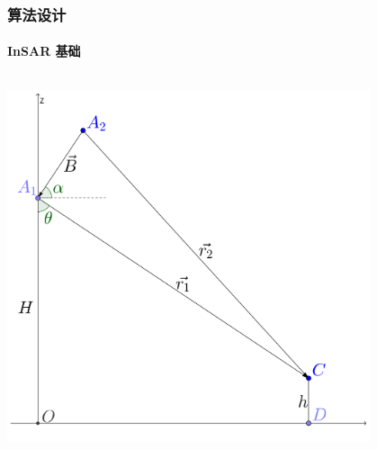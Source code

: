 \documentclass{beamer}
\begin{document}
\begin{frame}
    \frametitle{算法设计}
    \framesubtitle{InSAR 基础}


    \begin{columns}
        \begin{column}{0.5\textwidth}
            \centering

            \includegraphics[width=0.8\textwidth]{figures/insar_simple.pdf}


\end{column}
\end{columns}
\end{frame}
\end{document}
